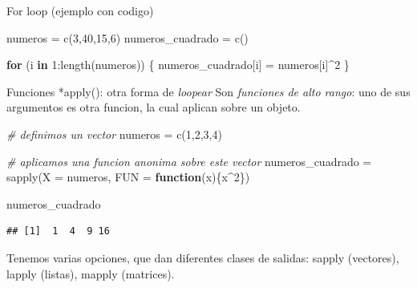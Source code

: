 \documentclass[
  10pt,
  ignorenonframetext,
]{beamer}
\newenvironment{Shaded}{\begin{snugshade}}{\end{snugshade}}
\newcommand{\AttributeTok}[1]{\textcolor[rgb]{0.77,0.63,0.00}{#1}}
\newcommand{\CommentTok}[1]{\textcolor[rgb]{0.56,0.35,0.01}{\textit{#1}}}
\newcommand{\ControlFlowTok}[1]{\textcolor[rgb]{0.13,0.29,0.53}{\textbf{#1}}}
\newcommand{\DecValTok}[1]{\textcolor[rgb]{0.00,0.00,0.81}{#1}}
\newcommand{\FunctionTok}[1]{\textcolor[rgb]{0.00,0.00,0.00}{#1}}
\newcommand{\NormalTok}[1]{#1}
\newcommand{\OtherTok}[1]{\textcolor[rgb]{0.56,0.35,0.01}{#1}}
\newcommand{\SpecialCharTok}[1]{\textcolor[rgb]{0.00,0.00,0.00}{#1}}
\begin{document}
\begin{frame}[fragile]{For loop (ejemplo con codigo)}
\protect\hypertarget{for-loop-ejemplo-con-codigo}{}
\begin{Shaded}
\begin{Highlighting}[]
\NormalTok{numeros }\OtherTok{=} \FunctionTok{c}\NormalTok{(}\DecValTok{3}\NormalTok{,}\DecValTok{40}\NormalTok{,}\DecValTok{15}\NormalTok{,}\DecValTok{6}\NormalTok{)}
\NormalTok{numeros\_cuadrado }\OtherTok{=} \FunctionTok{c}\NormalTok{()}

\ControlFlowTok{for}\NormalTok{ (i }\ControlFlowTok{in} \DecValTok{1}\SpecialCharTok{:}\FunctionTok{length}\NormalTok{(numeros)) \{}
\NormalTok{  numeros\_cuadrado[i] }\OtherTok{=}\NormalTok{ numeros[i]}\SpecialCharTok{\^{}}\DecValTok{2}
\NormalTok{\}}
\end{Highlighting}
\end{Shaded}
\end{frame}

\begin{frame}[fragile]{Funciones *apply(): otra forma de \emph{loopear}}
\protect\hypertarget{funciones-apply-otra-forma-de-loopear}{}
Son \emph{funciones de alto rango}: uno de sus argumentos es otra
funcion, la cual aplican sobre un objeto.

\small

\begin{Shaded}
\begin{Highlighting}[]
\CommentTok{\# definimos un vector}
\NormalTok{numeros }\OtherTok{=} \FunctionTok{c}\NormalTok{(}\DecValTok{1}\NormalTok{,}\DecValTok{2}\NormalTok{,}\DecValTok{3}\NormalTok{,}\DecValTok{4}\NormalTok{)}

\CommentTok{\# aplicamos una funcion anonima sobre este vector}
\NormalTok{numeros\_cuadrado }\OtherTok{=} \FunctionTok{sapply}\NormalTok{(}\AttributeTok{X =}\NormalTok{ numeros, }\AttributeTok{FUN =} \ControlFlowTok{function}\NormalTok{(x)\{x}\SpecialCharTok{\^{}}\DecValTok{2}\NormalTok{\})}

\NormalTok{numeros\_cuadrado}
\end{Highlighting}
\end{Shaded}

\begin{verbatim}
## [1]  1  4  9 16
\end{verbatim}

\normalsize

\vspace{12pt}

Tenemos varias opciones, que dan diferentes clases de salidas: sapply
(vectores), lapply (listas), mapply (matrices).
\end{frame}
\end{document}
